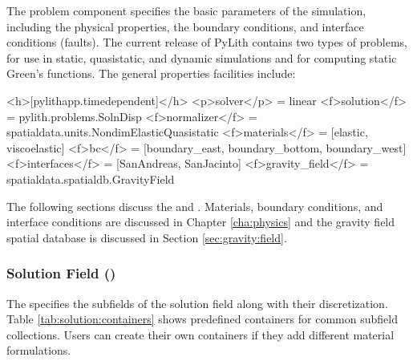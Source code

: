 The problem component specifies the basic parameters of the simulation,
including the physical properties, the boundary conditions, and interface
conditions (faults). The current release of PyLith contains two types
of problems,  for use in static, quasistatic,
and dynamic simulations and  for computing static
Green's functions. The general properties facilities include:
\begin{inventory}
\end{inventory}

\begin{cfg}
<h>[pylithapp.timedependent]</h>
<p>solver</p> = linear
<f>solution</f> = pylith.problems.SolnDisp
<f>normalizer</f> = spatialdata.units.NondimElasticQuasistatic
<f>materials</f> = [elastic, viscoelastic]
<f>bc</f> = [boundary_east, boundary_bottom, boundary_west]
<f>interfaces</f> = [SanAndreas, SanJacinto]
<f>gravity_field</f> = spatialdata.spatialdb.GravityField
\end{cfg}

The following sections discuss the  and
. Materials, boundary conditions, and interface
conditions are discussed in Chapter \vref{cha:physics} and the gravity
field spatial database is discussed in Section
\vref{sec:gravity:field}.

\subsubsection{Solution Field ()}

The  specifies the subfields of the solution
field along with their discretization. Table
\vref{tab:solution:containers} shows predefined containers for common
subfield collections. Users can create their own containers if they
add different material formulations.

